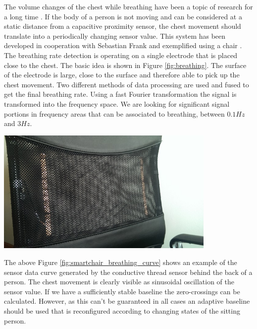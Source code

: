 The volume changes of the chest while breathing have been a topic of research for a long time \cite{wade1954movements}. If the body of a person is not moving and can be considered at a static distance from a capacitive proximity sensor, the chest movement should translate into a periodically changing sensor value. This system has been developed in cooperation with Sebastian Frank and exemplified using a chair \cite{Braun2013ChairAid}. The breathing rate detection is operating on a single electrode that is placed close to the chest. The basic idea is shown in Figure \ref{fig:breathing}. The surface of the electrode is large, close to the surface and therefore able to pick up the chest movement. Two different methods of data processing are used and fused to get the final breathing rate. Using a fast Fourier transformation the signal is transformed into the frequency space. We are looking for significant signal portions in frequency areas that can be associated to breathing, between $0.1Hz$ and $3Hz$. 

\begin{minipage}{\linewidth}
\centering
\includegraphics[width=0.8\textwidth]{images/smartchair_thread}
\label{fig:smartchair_breathing_curve}
\end{minipage}

The above Figure \ref{fig:smartchair_breathing_curve} shows an example of the sensor data curve generated by the conductive thread sensor behind the back of a person. The chest movement is clearly visible as sinusoidal oscillation of the sensor value. If we have a sufficiently stable baseline the zero-crossings can be calculated. However, as this can't be guaranteed in all cases an adaptive baseline should be used that is reconfigured according to changing states of the sitting person. 

